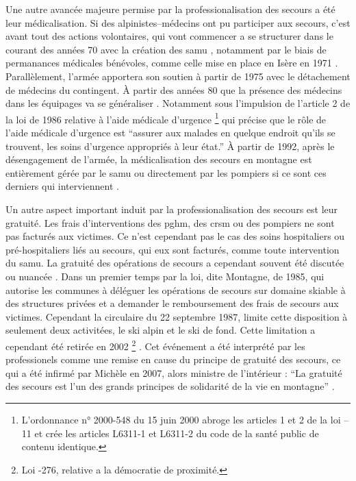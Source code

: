 Une autre avancée majeure permise par la professionalisation des
secours a été leur médicalisation. Si des alpinistes--médecins ont pu
participer aux secours, c'est avant tout des actions volontaires, qui
vont commencer a se structurer dans le courant des années 70 avec la
création des \ac{samu} \autocite{Halle2007}, notamment par le biais de
permanances médicales bénévoles, comme celle mise en place en Isère en
1971 \autocite{Rocourt2014}. Parallèlement, l'armée apportera son
soutien à partir de 1975 avec le détachement de médecins du
contingent. À partir des années 80 que la présence des médecins dans
les équipages va se généraliser \autocite{CFDLD}. Notamment sous
l'impulsion de l'article 2 de la loi de 1986 relative à l'aide
médicale d'urgence \footnote{L’ordonnance n° 2000-548 du 15 juin 2000
  abroge les articles 1 et 2 de la loi --11 et crée les articles
  L6311-1 et L6311-2 du code de la santé public de contenu identique.}
\autocite{Rocourt2014} qui précise que le rôle de l'aide médicale
d'urgence est \enquote{assurer aux malades \textelp{} en
  quelque endroit qu'ils se trouvent, les soins d'urgence appropriés à
  leur état.} À partir de 1992, après le désengagement de l'armée, la
médicalisation des secours en montagne est entièrement gérée par le
\ac{samu} ou directement par les pompiers si ce sont ces derniers qui
interviennent \autocite{Rocourt2014, Halle2007}.

Un autre aspect important induit par la professionalisation des
secours est leur gratuité. Les frais d'interventions des \ac{pghm},
des \ac{crsm} ou des pompiers ne sont pas facturés aux victimes. Ce
n'est cependant pas le cas des soins hospitaliers ou pré-hospitaliers
liés au secours, qui eux sont facturés, comme toute intervention du
\ac{samu}. La gratuité des opérations de secours a cependant souvent
été discutée ou nuancée \autocite{CFDLD, Halle2007, Magne2017}. Dans
un premier temps par la loi, dite Montagne, de 1985, qui autorise les
communes à déléguer les opérations de secours sur domaine skiable à
des structures privées et a demander le remboursement des frais de
secours aux victimes. Cependant la circulaire du 22 septembre 1987,
limite cette disposition à seulement deux activitées, le ski alpin et
le ski de fond. Cette limitation a cependant été retirée en 2002
\footnote{Loi -276, relative a la démocratie de proximité.}
\autocite{Magne2017}. Cet événement a été interprété par les
professionels comme une remise en cause du principe de gratuité des
secours, ce qui a été infirmé par Michèle  en 2007,
alors ministre de l'intérieur : \enquote{La gratuité des secours est
  l’un des grands principes de solidarité de la vie en montagne}
\autocite{CFDLD}.

